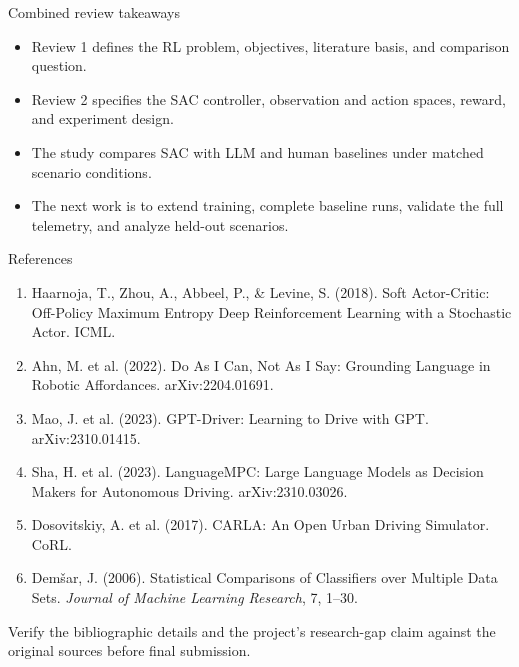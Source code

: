 \documentclass[aspectratio=169,10pt]{beamer}
\begin{document}
\begin{frame}{Combined review takeaways}
\begin{itemize}
  \item Review 1 defines the RL problem, objectives, literature basis, and comparison question.
  \item Review 2 specifies the SAC controller, observation and action spaces, reward, and experiment design.
  \item The study compares SAC with LLM and human baselines under matched scenario conditions.
  \item The next work is to extend training, complete baseline runs, validate the full telemetry, and analyze held-out scenarios.
\end{itemize}
\end{frame}

\begin{frame}{References}
\small
\begin{enumerate}
  \item Haarnoja, T., Zhou, A., Abbeel, P., \& Levine, S. (2018). Soft Actor-Critic: Off-Policy Maximum Entropy Deep Reinforcement Learning with a Stochastic Actor. ICML.
  \item Ahn, M. et al. (2022). Do As I Can, Not As I Say: Grounding Language in Robotic Affordances. arXiv:2204.01691.
  \item Mao, J. et al. (2023). GPT-Driver: Learning to Drive with GPT. arXiv:2310.01415.
  \item Sha, H. et al. (2023). LanguageMPC: Large Language Models as Decision Makers for Autonomous Driving. arXiv:2310.03026.
  \item Dosovitskiy, A. et al. (2017). CARLA: An Open Urban Driving Simulator. CoRL.
  \item Dem\v{s}ar, J. (2006). Statistical Comparisons of Classifiers over Multiple Data Sets. \textit{Journal of Machine Learning Research}, 7, 1--30.
\end{enumerate}
\vspace{0.3em}
Verify the bibliographic details and the project's research-gap claim against the original sources before final submission.
\end{frame}
\end{document}
